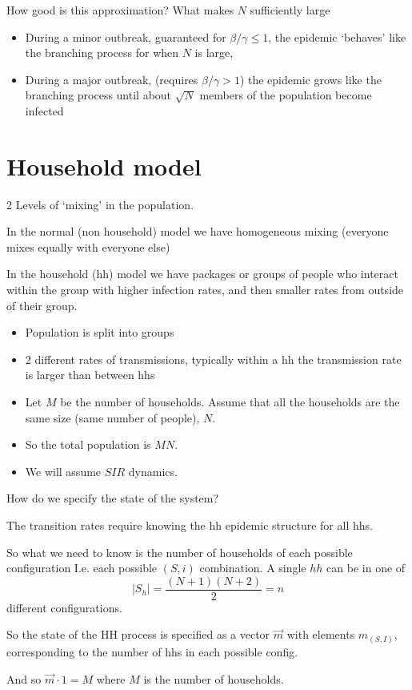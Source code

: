 \documentclass{/home/janmebows/Documents/LatexTemplates/myassignment}
\begin{document}
How good is this approximation? What makes $N$ sufficiently large
\begin{itemize}
    \item During a minor outbreak, guaranteed for $\beta/\gamma \leq 1$, the epidemic `behaves' like the branching process for when $N$ is large,
    \item During a major outbreak, (requires $\beta/\gamma >1$) the epidemic grows like the branching process until about $\sqrt{N}$ members of the population become infected
\end{itemize}

\section{Household model}
2 Levels of `mixing' in the population.

In the normal (non household) model we have homogeneous mixing (everyone mixes equally with everyone else)

In the household (hh) model we have packages or groups of people who interact within the group with higher infection rates, and then smaller rates from outside of their group.

\begin{itemize}
    \item Population is split into groups
    \item 2 different rates of transmissions, typically within a hh the transmission rate is larger than between hhs\
    \item Let $M$ be the number of households. Assume that all the households are the same size (same number of people), $N$.
    \item So the total population is $MN$.
    \item We will assume $SIR$ dynamics.
\end{itemize}
How do we specify the state of the system?

The transition rates require knowing the hh epidemic structure for all hhs.

So what we need to know is the number of households of each possible configuration I.e. each possible $(S,i)$ combination. 
A single $hh$ can be in one of 
\[|S_h| = \frac{(N+1)(N+2)}2 = n\]
different configurations.


So the state of the HH process is specified as a vector $\vec m$ with elements $m_{(S,I)}$, corresponding to the number of hhs in each possible config.

And so $\vec m \cdot 1 = M$ where $M$ is the number of households.
\end{document}
